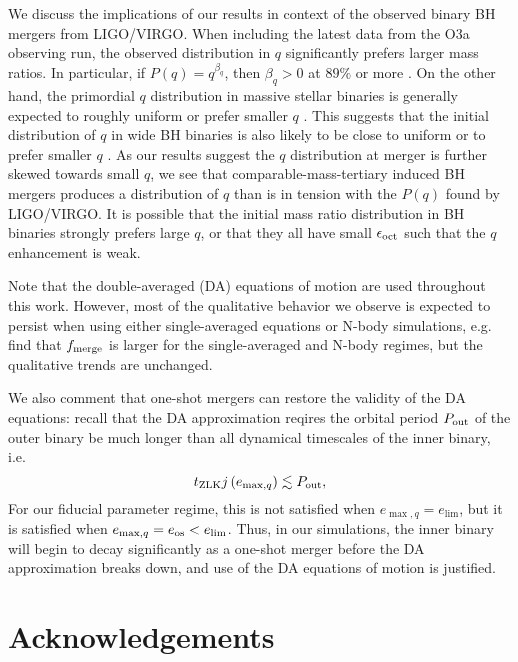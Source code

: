 \documentclass[
        fleqn,
        usenatbib,
    ]{mnras}
\newcommand*{\p}[1]{\left(#1\right)}
\begin{document}
We discuss the implications of our results in context of the observed binary BH
mergers from LIGO/VIRGO\@. When including the latest data from the O3a observing
run, the observed distribution in $q$ significantly prefers larger mass ratios.
In particular, if $P(q) = q^{\beta_q}$, then $\beta_q > 0$ at $89\%$ or more
\citep{LIGOO3a}. On the other hand, the primordial $q$ distribution in massive
stellar binaries is generally expected to roughly uniform or prefer smaller $q$
\citep[e.g.][]{sana2012binary, duchene2013, kobulnicky2014, moe2017mind}.
This suggests that the initial distribution of $q$ in wide BH binaries is also
likely to be close to uniform or to prefer smaller $q$ \citep[for reasonable
assumptions on BH remnant masses after supernovae, see e.g.][]{farmer_bhmass}.
As our results suggest the $q$ distribution at merger is further skewed towards
small $q$, we see that comparable-mass-tertiary induced BH mergers produces a
distribution of $q$ than is in tension with the $P(q)$ found by LIGO/VIRGO\@. It
is possible that the initial mass ratio distribution in BH binaries strongly
prefers large $q$, or that they all have small $\epsilon_{\rm oct}$ such that
the $q$ enhancement is weak.

Note that the double-averaged (DA) equations of motion are used throughout this
work. However, most of the qualitative behavior we observe is expected to
persist when using either single-averaged equations or N-body simulations, e.g.\
\citet{LL19} find that $f_{\rm merge}$ is larger for the single-averaged and
N-body regimes, but the qualitative trends are unchanged.

We also comment that one-shot mergers can restore the validity of the DA
equations: recall that the DA approximation reqires the orbital period $P_{\rm
out}$ of the outer binary be much longer than all dynamical timescales of the
inner binary, i.e.
\begin{equation}
    t_{\rm ZLK}j\p{e_{\max, q}} \lesssim P_{\rm out},
\end{equation}
For our fiducial parameter regime, this is not satisfied when $e_{\max, q} =
e_{\lim}$, but it is satisfied when $e_{\max, q} = e_{\rm os} < e_{\lim}$. Thus,
in our simulations, the inner binary will begin to decay significantly as a
one-shot merger before the DA approximation breaks down, and use of the DA
equations of motion is justified.

\section{Acknowledgements}\label{s:ack}
\end{document}
